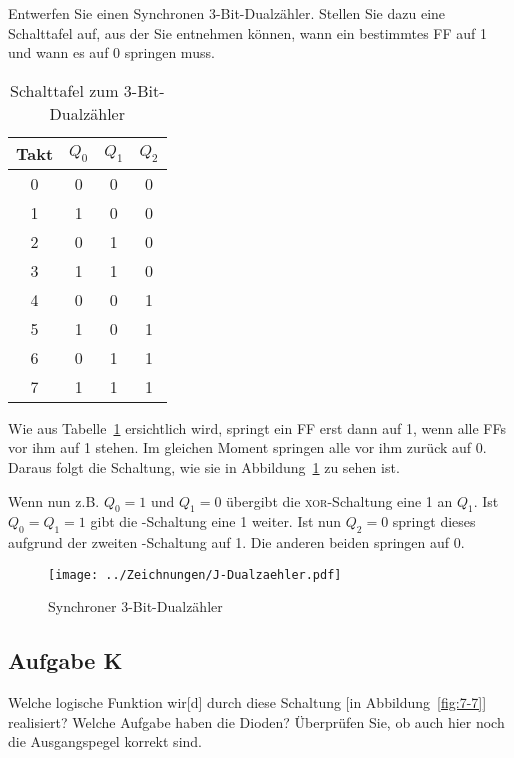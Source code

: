 \begin{problem}
    Entwerfen Sie einen Synchronen 3-Bit-Dualzähler. Stellen Sie dazu eine
    Schalttafel auf, aus der Sie entnehmen können, wann ein bestimmtes FF auf 1
    und wann es auf 0 springen muss.
\end{problem}

\begin{table}[htbp]
    \centering
    \begin{tabular}{c|ccc}
        Takt & $Q_0$ & $Q_1$ & $Q_2$\\
        \hline
        0 & 0 & 0 & 0\\
        1 & 1 & 0 & 0\\
        2 & 0 & 1 & 0\\
        3 & 1 & 1 & 0\\
        4 & 0 & 0 & 1\\
        5 & 1 & 0 & 1\\
        6 & 0 & 1 & 1\\
        7 & 1 & 1 & 1\\
    \end{tabular}
    \caption{%
        Schalttafel zum 3-Bit-Dualzähler
    }
    \label{tab:Aufgabe_J}
\end{table}

Wie aus Tabelle~\ref{tab:Aufgabe_J} ersichtlich wird, springt ein FF erst dann
auf 1, wenn alle FFs vor ihm auf 1 stehen. Im gleichen Moment springen alle vor
ihm zurück auf 0. Daraus folgt die Schaltung, wie sie in
Abbildung~\ref{fig:J-Dualzähler} zu sehen ist.

Wenn nun z.B. $Q_0 = 1$ und $Q_1 = 0$ übergibt die \textsc{xor}-Schaltung eine
1 an $Q_1$. Ist  $Q_0 = Q_1 = 1$ gibt die \tand-Schaltung eine 1 weiter. Ist
nun $Q_2 = 0$ springt dieses aufgrund der zweiten \txor-Schaltung auf 1. Die
anderen beiden springen auf 0.

\begin{figure}[htbp]
    \centering
    \texttt{[image: ../Zeichnungen/J-Dualzaehler.pdf]}
    \caption{%
        Synchroner 3-Bit-Dualzähler
    }
    \label{fig:J-Dualzähler}
\end{figure}

\FloatBarrier
\subsection{Aufgabe K}

\begin{problem}
	Welche logische Funktion wir[d] durch diese Schaltung [in
	Abbildung~\ref{fig:7-7}] realisiert? Welche Aufgabe haben die Dioden?
	Überprüfen Sie, ob auch hier noch die Ausgangspegel korrekt sind.
\end{problem}

